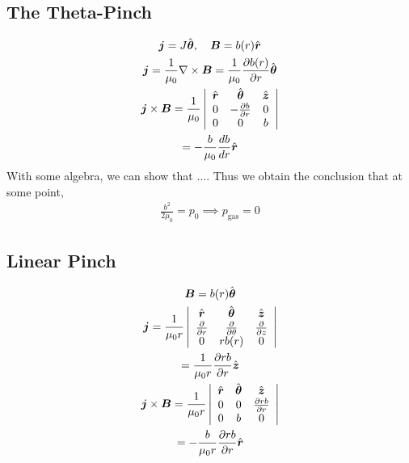 \documentclass{article}
\begin{document}
\subsection{The Theta-Pinch}
\begin{gather*}
    \boldsymbol{j} = J\hat{\boldsymbol{\theta}}, \quad \boldsymbol{B} = b(r)\hat{\boldsymbol{r}}\\
    \boldsymbol{j} = \frac{1}{\mu_0}\nabla\times\boldsymbol{B} =
    \frac{1}{\mu_0}\frac{\partial b(r)}{\partial r}\hat{\boldsymbol{\theta}}\\
    \boldsymbol{j}\times\boldsymbol{B} = \frac{1}{\mu_0}\left|\begin{array}{c c c}
                    \hat{\boldsymbol{r}} & \hat{\boldsymbol{\theta}} & \hat{\boldsymbol{z}} \\
                    0 & -\frac{\partial b}{\partial r} & 0\\
                    0 & 0 & b\end{array}\right|\\
                  = -\frac{b}{\mu_0}\frac{db}{dr}\hat{\boldsymbol{r}}
\end{gather*}
With some algebra, we can show that $\ldots$.
Thus we obtain the conclusion that at some point,
\begin{gather*}
    \frac{b^2}{2\mu_0} = p_0 \implies p_{\text{gas}} = 0 
\end{gather*}

\subsection{Linear Pinch}

\begin{gather*}
    \boldsymbol{B} = b(r)\hat{\boldsymbol{\theta}}\\
    \boldsymbol{j} = \frac{1}{\mu_0r}\left|\begin{array}{c c c}
            \hat{\boldsymbol{r}} & \hat{\boldsymbol{\theta}} & \hat{\boldsymbol{z}} \\
            \frac{\partial }{\partial r} & \frac{\partial }{\partial \theta} & \frac{\partial }{\partial z}\\
            0 & rb(r) & 0\end{array}\right|\\
            = \frac{1}{\mu_0 r}\frac{\partial rb}{\partial r}\hat{\boldsymbol{z}}\\
    \boldsymbol{j}\times\boldsymbol{B} = \frac{1}{\mu_0r}\left|\begin{array}{c c c}
            \hat{\boldsymbol{r}} & \hat{\boldsymbol{\theta}} & \hat{\boldsymbol{z}} \\
            0 & 0 & \frac{\partial rb}{\partial r}\\
            0 & b & 0\end{array}\right|\\
            = -\frac{b}{\mu_0r}\frac{\partial rb}{\partial r}\hat{\boldsymbol{r}}
\end{gather*}
\end{document}

